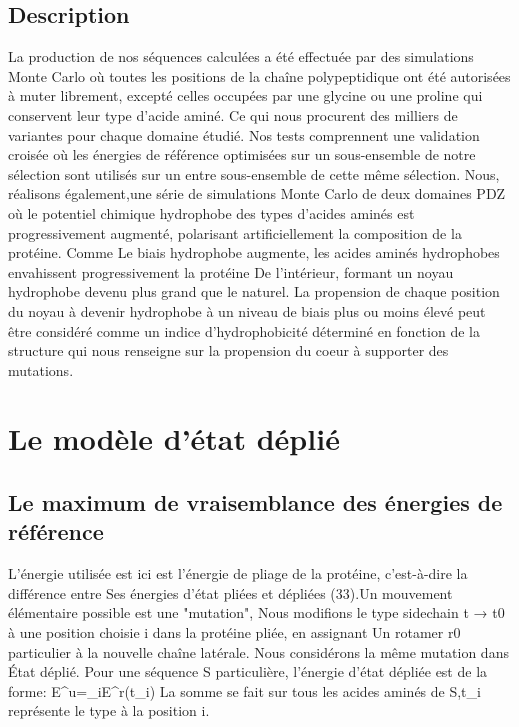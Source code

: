 \subsection{Description}
La production de nos séquences calculées a été effectuée par des simulations Monte Carlo où toutes les positions de la chaîne polypeptidique ont été autorisées à muter librement, excepté celles occupées par une glycine ou une proline qui conservent leur type d'acide aminé. Ce qui nous procurent des milliers de variantes pour chaque domaine étudié. Nos tests comprennent une validation croisée où les énergies de référence optimisées sur un sous-ensemble de notre sélection sont utilisés sur un entre sous-ensemble de cette même sélection. Nous, réalisons également,une série de simulations Monte Carlo de deux domaines PDZ où le potentiel chimique hydrophobe des types d'acides aminés est progressivement augmenté, polarisant artificiellement la composition de la protéine. Comme Le biais hydrophobe augmente, les acides aminés hydrophobes envahissent progressivement  la protéine
De l'intérieur, formant un noyau hydrophobe devenu plus grand que le naturel.
La propension de chaque position du noyau à devenir hydrophobe à un niveau de biais plus ou moins élevé peut être considéré comme un indice d'hydrophobicité déterminé en fonction de la structure qui nous renseigne sur la propension du coeur à supporter des mutations.

\section{Le modèle d'état déplié}
\subsection{Le maximum de vraisemblance des énergies de référence}

L'énergie utilisée est ici est l'énergie de pliage de la protéine, c'est-à-dire la différence entre
Ses énergies d'état pliées et dépliées (33).Un mouvement élémentaire possible est une "mutation",
Nous modifions le type sidechain t → t0 à une position choisie i dans la protéine pliée, en assignant
Un rotamer r0 particulier à la nouvelle chaîne latérale. Nous considérons la même mutation dans
État déplié. Pour une séquence S particulière, l'énergie d'état dépliée est de la forme:
E^u=\sum_{i\inS}E^r(t_i)
La somme se fait sur tous les acides aminés de S,t_i représente le type  à la position i.

